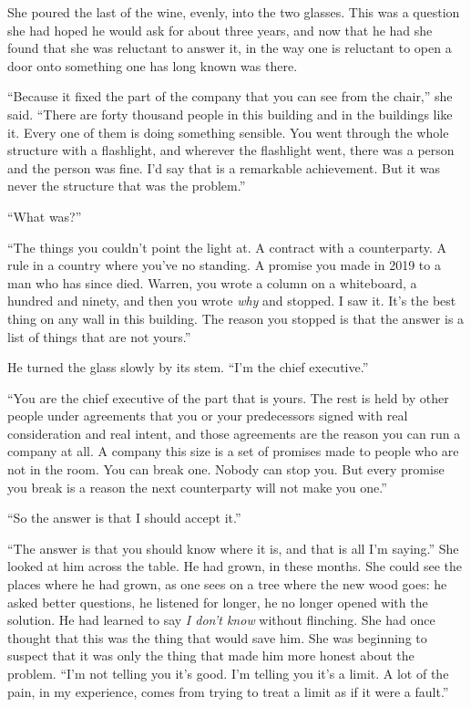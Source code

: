 She poured the last of the wine, evenly, into the two glasses. This was a question she had hoped he would ask for about three years, and now that he had she found that she was reluctant to answer it, in the way one is reluctant to open a door onto something one has long known was there.

``Because it fixed the part of the company that you can see from the chair,'' she said. ``There are forty thousand people in this building and in the buildings like it. Every one of them is doing something sensible. You went through the whole structure with a flashlight, and wherever the flashlight went, there was a person and the person was fine. I'd say that is a remarkable achievement. But it was never the structure that was the problem.''

``What was?''

``The things you couldn't point the light at. A contract with a counterparty. A rule in a country where you've no standing. A promise you made in 2019 to a man who has since died. Warren, you wrote a column on a whiteboard, a hundred and ninety, and then you wrote \emph{why} and stopped. I saw it. It's the best thing on any wall in this building. The reason you stopped is that the answer is a list of things that are not yours.''

He turned the glass slowly by its stem. ``I'm the chief executive.''

``You are the chief executive of the part that is yours. The rest is held by other people under agreements that you or your predecessors signed with real consideration and real intent, and those agreements are the reason you can run a company at all. A company this size is a set of promises made to people who are not in the room. You can break one. Nobody can stop you. But every promise you break is a reason the next counterparty will not make you one.''

``So the answer is that I should accept it.''

``The answer is that you should know where it is, and that is all I'm saying.'' She looked at him across the table. He had grown, in these months. She could see the places where he had grown, as one sees on a tree where the new wood goes: he asked better questions, he listened for longer, he no longer opened with the solution. He had learned to say \emph{I don't know} without flinching. She had once thought that this was the thing that would save him. She was beginning to suspect that it was only the thing that made him more honest about the problem. ``I'm not telling you it's good. I'm telling you it's a limit. A lot of the pain, in my experience, comes from trying to treat a limit as if it were a fault.''

